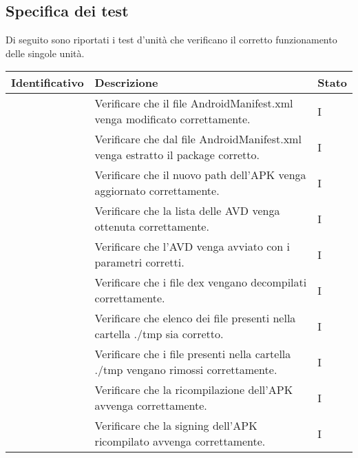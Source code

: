 \subsection{Specifica dei test}\label{subsec:specifica-dei-test}
Di seguito sono riportati i test d'unità che verificano il corretto funzionamento delle singole unità.
\begin{center}
    \begin{longtable}{ |C{3cm} | C{8.5cm}| C{1.5cm} |}
        \hline
        \textbf{Identificativo} & \textbf{Descrizione}                                                                                    & \textbf{Stato} \\\hline
                     & Verificare che il file AndroidManifest.xml venga modificato correttamente.                              & I              \\\hline
                     & Verificare che dal file AndroidManifest.xml venga estratto il package corretto.                         & I              \\\hline
                     & Verificare che il nuovo path dell'APK venga aggiornato correttamente.                                   & I              \\\hline
                     & Verificare che la lista delle AVD venga ottenuta correttamente.                                         & I              \\\hline
                     & Verificare che l'AVD venga avviato con i parametri corretti.                                            & I              \\\hline
                     & Verificare che i file dex vengano decompilati correttamente.                                            & I              \\\hline
                     & Verificare che elenco dei file presenti nella cartella ./tmp sia corretto.                              & I              \\\hline
                     & Verificare che i file presenti nella cartella ./tmp vengano rimossi correttamente.                      & I              \\\hline
                     & Verificare che la ricompilazione dell'APK avvenga correttamente.                                        & I              \\\hline
                     & Verificare che la signing dell'APK ricompilato avvenga correttamente.                                   & I              \\\hline

\end{longtable}
\end{center}
